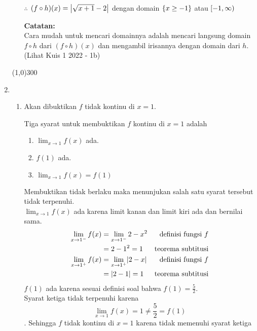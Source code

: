 \begin{enumerate}[leftmargin=*, label={\arabic*}.]
\begin{enumerate}[label={\alph*}.]
    $\therefore$ $(f \circ h)(x) = \abs*{\sqrt{x+1} - 2}$ dengan domain 
    $\set*{x \geq -1}$ atau $\cio{-1,\infty}$ 
        
    \vspace{0.1cm}
    \textbf{Catatan:}\\
    Cara mudah untuk mencari domainnya adalah mencari langsung domain 
    $f \circ h$ dari $(f \circ h)(x)$ dan mengambil irisannya dengan 
    domain dari $h$. (Lihat Kuis 1 2022 - 1b)

    \end{enumerate}
    
\begin{center}\line(1,0){300}\end{center}


\item
    \begin{enumerate}[label={\alph*}.]
    \item Akan dibuktikan $f$ tidak kontinu di $x=1$.
    
    Tiga syarat untuk membuktikan $f$ kontinu di $x=1$ adalah
        \begin{enumerate}[label={\arabic*}.]
        \item $\lim_{x\to 1} f(x)$ ada.
        \item $f(1)$ ada.
        \item $\lim_{x\to 1} f(x) = f(1)$
        \end{enumerate}
    Membuktikan tidak berlaku maka menunjukan salah satu syarat tersebut tidak
    terpenuhi.\\
    $\lim_{x\to 1} f(x)$ ada karena limit kanan dan limit kiri ada dan bernilai sama.
    \begin{align*}
        \lim_{x\to 1^{-}} f(x) 
        &= \lim_{x\to 1^{-}} 2-x^{2}
        &\text{definisi fungsi $f$}\\
        &= 2-1^{2} = 1
        &\text{teorema subtitusi}\\
        \lim_{x\to 1^{+}} f(x) 
        &= \lim_{x\to 1^{+}} \abs{2-x}
        &\text{definisi fungsi $f$}\\
        &= \abs{2-1} = 1
        &\text{teorema subtitusi}
    \end{align*}
    $f(1)$ ada karena sesuai definisi soal bahwa $f(1) = \frac{5}{2}$.\\
    Syarat ketiga tidak terpenuhi karena
    \[
        \lim_{x\to 1} f(x) = 1 \neq \frac{5}{2} = f(1)
    \].
    Sehingga $f$ tidak kontinu di $x=1$ karena tidak memenuhi syarat ketiga


\end{enumerate}
\end{enumerate}
